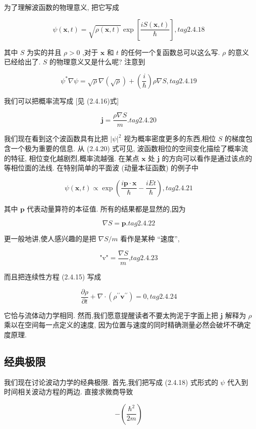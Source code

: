 \documentclass[lang=cn,newtx,10pt,scheme=chinese,thmcnt=section]{elegantbook}
\begin{document}
为了理解波函数的物理意义, 把它写成

$$
\psi \left( {\mathbf{x}, t}\right) = \sqrt{\rho \left( {\mathbf{x}, t}\right) }\exp \left\lbrack \frac{{iS}\left( {\mathbf{x}, t}\right) }{\hbar }\right\rbrack , tag{2.4.18}
$$

其中 $S$ 为实的并且 $\rho > 0$ ,对于 $\mathbf{x}$ 和 $t$ 的任何一个复函数总可以这么写. $\rho$ 的意义已经给出了. $S$ 的物理意义又是什么呢? 注意到

$$
{\psi }^{ * }\nabla \psi = \sqrt{\rho }\nabla \left( \sqrt{\rho }\right) + \left( \frac{i}{\hbar }\right) \rho \nabla S, tag{2.4.19}
$$

我们可以把概率流写成 [见 (2.4.16)式]

$$
\mathbf{j} = \frac{\rho \nabla S}{m}. tag{2.4.20}
$$

我们现在看到这个波函数具有比把 ${\left| \psi \right| }^{2}$ 视为概率密度更多的东西,相位 $S$ 的梯度包含一个极为重要的信息. 从 (2.4.20) 式可见, 波函数相位的空间变化描绘了概率流的特征, 相位变化越剧烈,概率流越强. 在某点 $\mathbf{x}$ 处 $\mathbf{j}$ 的方向可以看作是通过该点的等相位面的法线. 在特别简单的平面波 (动量本征函数) 的例子中

$$
\psi \left( {\mathbf{x}, t}\right) \propto \exp \left( {\frac{i\mathbf{p} \cdot \mathbf{x}}{\hbar } - \frac{iEt}{\hbar }}\right) , tag{2.4.21}
$$

其中 $\mathbf{p}$ 代表动量算符的本征值. 所有的结果都是显然的,因为

$$
\nabla S = \mathbf{p}. tag{2.4.22}
$$

更一般地讲,使人感兴趣的是把 $\nabla S/m$ 看作是某种 “速度”,

$$
\text{"v"} = \frac{\nabla S}{m}\text{,} tag{2.4.23}
$$

而且把连续性方程 (2.4.15) 写成

$$
\frac{\partial \rho }{\partial t} + \nabla \cdot \left( {{\rho }^{\prime \prime }{\mathbf{v}}^{\prime \prime }}\right) = 0, tag{2.4.24}
$$

它恰与流体动力学相同. 然而,我们愿意提醒读者不要太拘泥于字面上把 $\mathbf{j}$ 解释为 $\rho$ 乘以在空间每一点定义的速度, 因为位置与速度的同时精确测量必然会破坏不确定度原理.

\subsection*{经典极限}
我们现在讨论波动力学的经典极限. 首先,我们把写成 (2.4.18) 式形式的 $\psi$ 代入到时间相关波动方程的两边. 直接求微商导致

$$
- \left( \frac{{\hbar }^{2}}{2m}\right)
$$
\end{document}
